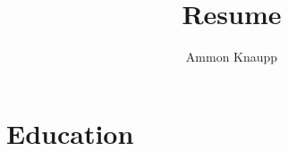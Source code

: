 \documentclass{article}
\author{Ammon Knaupp}
\title{Resume}
\begin{document}
\maketitle

\section{Education}
\end{document}
